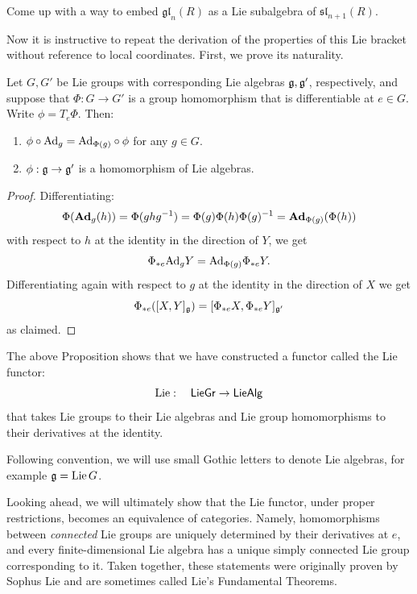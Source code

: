 \begin{xca}
    Come up with a way to embed $\mathfrak{gl}_n(R)$ as a Lie subalgebra of $\mathfrak{sl}_{n+1}(R)$.
\end{xca}


Now it is instructive to repeat the derivation of the properties of this Lie bracket without reference to local coordinates. First, we prove its naturality.

\begin{prop}[{{\cite[Prop.~1.1.3]{DK}}}]\label{prop 1.1.3 DK}
    Let $G,G'$ be Lie groups with corresponding Lie algebras $\mathfrak{g},\mathfrak{g}'$, respectively, and suppose that $\Phi:G\to G'$ is a group homomorphism that is differentiable at $e\in G$. Write $\phi=T_e \Phi$. Then:
    \begin{enumerate}
        \item $\phi\circ \mathrm{Ad}_g=\mathrm{Ad}_{\Phi(g)}\circ \phi$ for any $g\in G$.
        \item $\phi:\mathfrak{g}\to\mathfrak{g}'$ is a homomorphism of Lie algebras.
    \end{enumerate}
\end{prop}
\begin{proof}
    Differentiating:
    \[\Phi(\mathrm{\mathbf{Ad}}_g(h))=\Phi(ghg^{-1})=\Phi(g)\Phi(h)\Phi(g)^{-1}=\mathrm{\mathbf{Ad}}_{\Phi(g)}(\Phi(h))\]
    with respect to $h$ at the identity in the direction of $Y$, we get
    \[\Phi_{\ast e} \mathrm{Ad}_g Y=\mathrm{Ad}_{\Phi(g)} \Phi_{\ast e}Y.\]
    Differentiating again with respect to $g$ at the identity in the direction of $X$ we get
    \[\Phi_{\ast e}([X,Y]_{\mathfrak{g}})=[\Phi_{\ast e}X,\Phi_{\ast e}Y]_{\mathfrak{g}'}\]
    as claimed.
\end{proof}
\begin{cor}
    The above Proposition shows that we have constructed a functor called the Lie functor:
    \[\operatorname{Lie}:\quad \mathsf{LieGr}\to \mathsf{LieAlg}\]
    that takes Lie groups to their Lie algebras and Lie group homomorphisms to their derivatives at the identity.
\end{cor}

\begin{rem}
    Following convention, we will use small Gothic letters to denote Lie algebras, for example $\mathfrak{g}=\operatorname{Lie} G$.
\end{rem}

\begin{rem}
    Looking ahead, we will ultimately show that the Lie functor, under proper restrictions, becomes an equivalence of categories. Namely, homomorphisms between \emph{connected} Lie groups are uniquely determined by their derivatives at $e$, and every finite-dimensional Lie algebra has a unique simply connected Lie group corresponding to it. Taken together, these statements were originally proven by Sophus Lie and are sometimes called Lie's Fundamental Theorems.
\end{rem}


